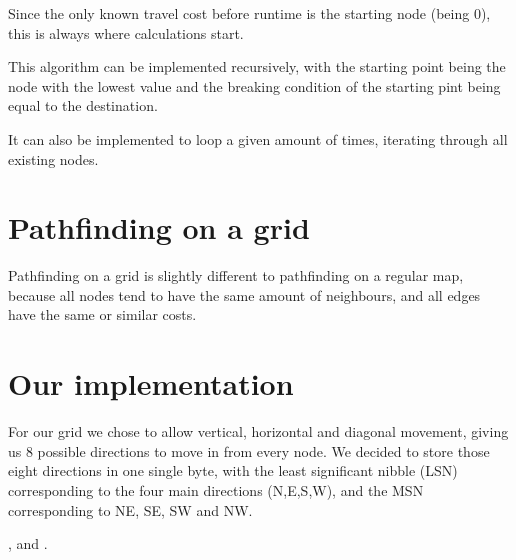 Since the only known travel cost before runtime is the starting node (being 0),
this is always where calculations start.

This algorithm can be implemented recursively,
with the starting point being the node with the lowest value
and the breaking condition of the starting pint being equal to the destination.

It can also be implemented to loop a given amount of times,
iterating through all existing nodes.

\section{Pathfinding on a grid}
Pathfinding on a grid is slightly different to pathfinding on a regular map,
because all nodes tend to have the same amount of neighbours,
and all edges have the same or similar costs.


\section{Our implementation}
For our grid we chose to allow vertical, horizontal and diagonal movement,
giving us 8 possible directions to move in from every node.
We decided to store those eight directions in one single byte,
with the least significant nibble (LSN) corresponding to the four main directions (N,E,S,W),
and the MSN corresponding to NE, SE, SW and NW.



\cite{Madsen2010}, \cite{Oetiker2010} and \cite{Mittelbach2005}.
